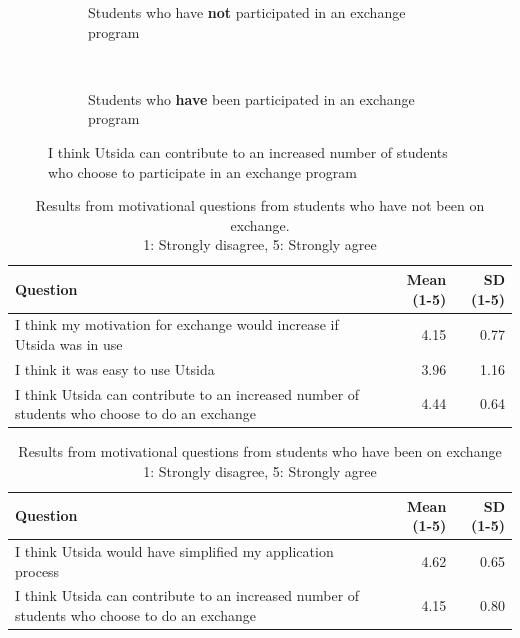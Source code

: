 \begin{figure}
    \centering
    \begin{subfigure}[b]{0.4\textwidth}
        \caption{Students who have \textbf{not} participated in an exchange program}
        \label{fig:gull}
    \end{subfigure}
    ~ \qquad %
    \begin{subfigure}[b]{0.4\textwidth}
       
        \caption{Students who \textbf{have} been participated in an exchange program}
        \label{fig:tiger}
    \end{subfigure}
    \caption{I think Utsida can contribute to an increased number of students who choose to participate in an exchange program}
\end{figure}

\begin{table}[h]
\small
\centering
\caption{Results from motivational questions from students who have not been on exchange. \\ 1: Strongly disagree, 5: Strongly agree}
\label{my-label}
\begin{tabulary}{\textwidth}{|L|R|R|}
\hline
\textbf{Question} & \textbf{Mean (1-5)} & \textbf{SD (1-5)} \\ \hline
I think my motivation for exchange would increase if Utsida was in use & 4.15 & 0.77 \\ \hline
I think it was easy to use Utsida & 3.96 & 1.16 \\ \hline
I think Utsida can contribute to an increased number of students who choose to do an exchange & 4.44 & 0.64 \\ \hline
\end{tabulary}
\end{table}

\begin{table}[h]
\small
\centering
\caption{Results from motivational questions from students who have been on 
exchange \\ 1: Strongly disagree, 5: Strongly agree}
\label{my-label}
\begin{tabulary}{\textwidth}{|L|R|R|}
\hline
\textbf{Question} & \textbf{Mean (1-5)} & \textbf{SD (1-5)} \\ \hline
I think Utsida would have simplified my application process & 4.62 & 0.65 \\ \hline
I think Utsida can contribute to an increased number of students who choose to do an exchange & 4.15 & 0.80 \\ \hline
\end{tabulary}
\end{table}


